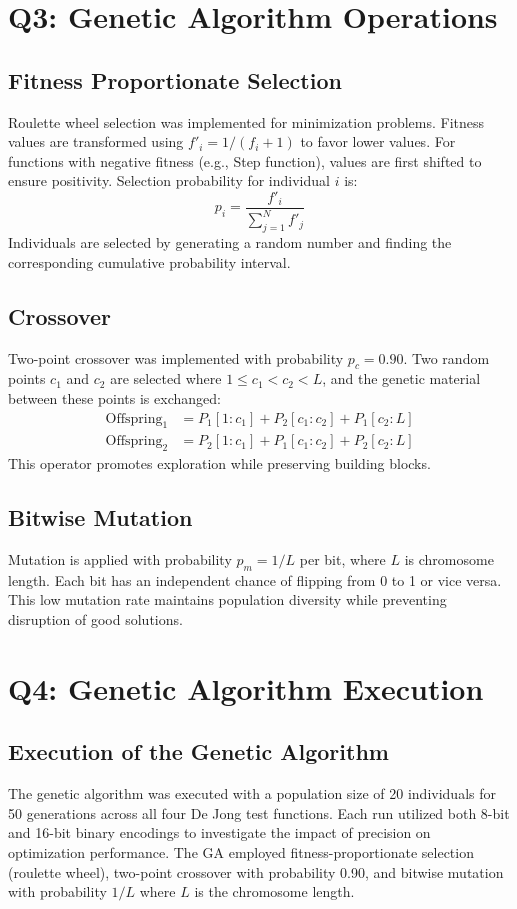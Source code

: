 \documentclass[journal,12pt,onecolumn]{IEEEtran}
\begin{document}
\section{Q3: Genetic Algorithm Operations}

\subsection{Fitness Proportionate Selection}
Roulette wheel selection was implemented for minimization problems. Fitness values are transformed using $f'_i = 1/(f_i + 1)$ to favor lower values. For functions with negative fitness (e.g., Step function), values are first shifted to ensure positivity. Selection probability for individual $i$ is:
\begin{equation}
p_i = \frac{f'_i}{\sum_{j=1}^{N} f'_j}
\end{equation}
Individuals are selected by generating a random number and finding the corresponding cumulative probability interval.

\subsection{Crossover}
Two-point crossover was implemented with probability $p_c = 0.90$. Two random points $c_1$ and $c_2$ are selected where $1 \leq c_1 < c_2 < L$, and the genetic material between these points is exchanged:
\begin{align}
\text{Offspring}_1 &= P_1[1:c_1] + P_2[c_1:c_2] + P_1[c_2:L] \\
\text{Offspring}_2 &= P_2[1:c_1] + P_1[c_1:c_2] + P_2[c_2:L]
\end{align}
This operator promotes exploration while preserving building blocks.

\subsection{Bitwise Mutation}
Mutation is applied with probability $p_m = 1/L$ per bit, where $L$ is chromosome length. Each bit has an independent chance of flipping from 0 to 1 or vice versa. This low mutation rate maintains population diversity while preventing disruption of good solutions.

\section{Q4: Genetic Algorithm Execution}

\subsection{Execution of the Genetic Algorithm}
The genetic algorithm was executed with a population size of 20 individuals for 50 generations across all four De Jong test functions. Each run utilized both 8-bit and 16-bit binary encodings to investigate the impact of precision on optimization performance. The GA employed fitness-proportionate selection (roulette wheel), two-point crossover with probability 0.90, and bitwise mutation with probability $1/L$ where $L$ is the chromosome length.
\end{document}
